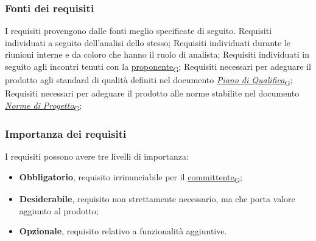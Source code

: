 \newpage

\subsubsection{Fonti dei requisiti}
\label{sec:fonti_requisiti}
I requisiti provengono dalle fonti meglio specificate di seguito.
Requisiti individuati a seguito dell'analisi dello stesso;
Requisiti individuati durante le riunioni interne e da coloro che hanno il ruolo di analista;
Requisiti individuati in seguito agli incontri tenuti con la \href{https://7last.github.io/docs/rtb/documentazione-interna/glossario\#proponente}{proponente\textsubscript{G}};
Requisiti necessari per adeguare il prodotto agli standard di qualità definiti nel documento \href{https://7last.github.io/docs/rtb/documentazione-interna/glossario\#piano-di-qualifica}{\textit{Piano di Qualifica}\textsubscript{G}};
Requisiti necessari per adeguare il prodotto alle norme stabilite nel documento
 \href{https://7last.github.io/docs/rtb/documentazione-interna/glossario\#norme-di-progetto}{\textit{Norme di Progetto}\textsubscript{G}};


\subsubsection{Importanza dei requisiti}
\label{sec:importanza_requisiti}
I requisiti possono avere tre livelli di importanza:
\begin{itemize}
	\item \textbf{Obbligatorio}, requisito irrinunciabile per il \href{https://7last.github.io/docs/rtb/documentazione-interna/glossario\#committente}{committente\textsubscript{G}};
	\item \textbf{Desiderabile}, requisito non strettamente necessario, ma che porta valore aggiunto al prodotto;
	\item \textbf{Opzionale}, requisito relativo a funzionalità aggiuntive.
\end{itemize}

\pagebreak
